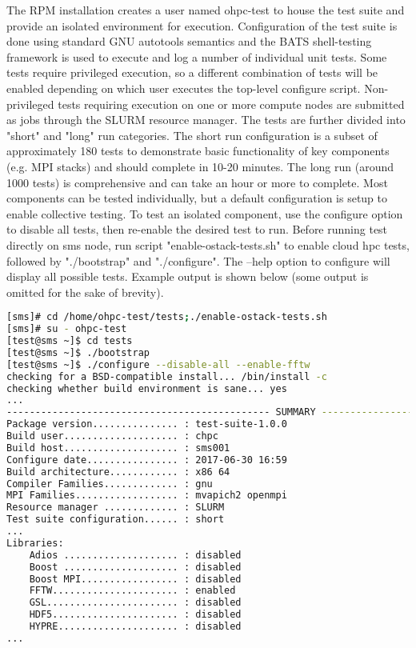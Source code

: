 The RPM installation creates a user named ohpc-test to house the test suite and provide an isolated environment for execution. Configuration of the test suite is done using standard GNU autotools semantics and the BATS shell-testing framework is used to execute and log a number of individual unit tests. Some tests require privileged execution, so a different combination of tests will be enabled depending on which user executes the top-level configure script. Non-privileged tests requiring execution on one or more compute nodes are submitted as jobs through the SLURM resource manager. The tests are further divided into "short" and "long" run categories. The short run configuration is a subset of approximately 180 tests to demonstrate basic functionality of key components (e.g. MPI stacks) and should complete in 10-20 minutes. The long run (around 1000 tests) is comprehensive and can take an hour or more to complete. Most components can be tested individually, but a default configuration is setup to enable collective testing. To test an isolated component, use the configure option to disable all tests, then re-enable the desired test to run. Before running test directly on sms node, run script "enable-ostack-tests.sh" to enable cloud hpc tests, followed by "./bootstrap" and "./configure". The --help option to configure will display all possible tests. Example output is shown below (some output is omitted for the sake of brevity).
\begin{lstlisting}[language=bash,keywords={},upquote=true]
[sms]# cd /home/ohpc-test/tests;./enable-ostack-tests.sh 
[sms]# su - ohpc-test
[test@sms ~]$ cd tests 
[test@sms ~]$ ./bootstrap
[test@sms ~]$ ./configure --disable-all --enable-fftw 
checking for a BSD-compatible install... /bin/install -c 
checking whether build environment is sane... yes 
... 
---------------------------------------------- SUMMARY --------------------------------------------
Package version............... : test-suite-1.0.0
Build user.................... : chpc
Build host.................... : sms001 
Configure date................ : 2017-06-30 16:59
Build architecture............ : x86 64 
Compiler Families............. : gnu 
MPI Families.................. : mvapich2 openmpi 
Resource manager ............. : SLURM 
Test suite configuration...... : short 
... 
Libraries: 
	Adios .................... : disabled 
	Boost .................... : disabled 
	Boost MPI................. : disabled 
	FFTW...................... : enabled 
	GSL....................... : disabled 
	HDF5...................... : disabled 
	HYPRE..................... : disabled 
...
\end{lstlisting}
	
